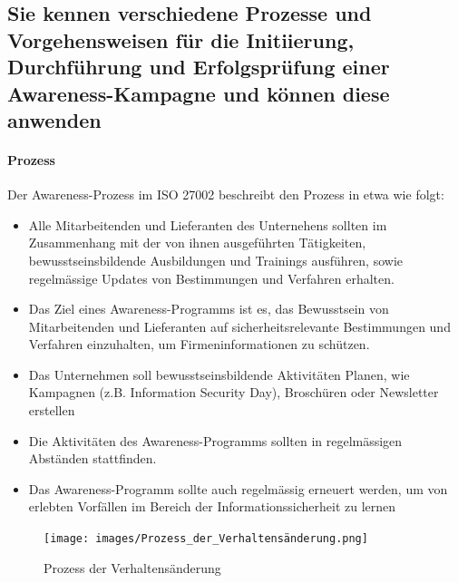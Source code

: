 \documentclass[10pt,a4paper]{article}
\begin{document}
\subsection*{Sie kennen verschiedene Prozesse und Vorgehensweisen für die Initiierung, Durchführung und Erfolgsprüfung einer Awareness-Kampagne und können diese anwenden}
\paragraph*{Prozess}\label{para:Awareness-Prozess}Der Awareness-Prozess im ISO 27002 beschreibt den Prozess in etwa wie folgt:
\begin{itemize}[noitemsep,topsep=0pt,leftmargin=*]
    \item Alle Mitarbeitenden und Lieferanten des Unternehens sollten im Zusammenhang mit der von ihnen ausgeführten Tätigkeiten, bewusstseinsbildende Ausbildungen und Trainings ausführen, sowie regelmässige Updates von Bestimmungen und Verfahren erhalten.
    \item Das Ziel eines Awareness-Programms ist es, das Bewusstsein von Mitarbeitenden und Lieferanten auf sicherheitsrelevante Bestimmungen und Verfahren einzuhalten, um Firmeninformationen zu schützen.
    \item Das Unternehmen soll bewusstseinsbildende Aktivitäten Planen, wie Kampagnen (z.B. Information Security Day), Broschüren oder Newsletter erstellen
    \item Die Aktivitäten des Awareness-Programms sollten in regelmässigen Abständen stattfinden.
    \item Das Awareness-Programm sollte auch regelmässig erneuert werden, um von erlebten Vorfällen im Bereich der Informationssicherheit zu lernen
\end{itemize}

\begin{figure}[H]
    \begin{center}
    \texttt{[image: images/Prozess\_der\_Verhaltensänderung.png]}
    \caption{Prozess der Verhaltensänderung}
    \label{Prozess der Verhaltensaenderung}
    \end{center}
\end{figure}
\end{document}
